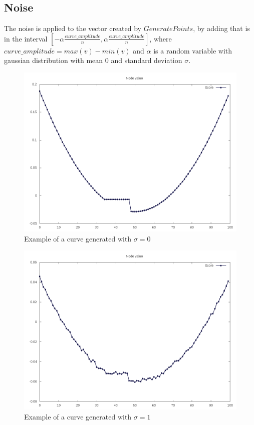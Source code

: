\documentclass[12pt]{article}
\begin{document}
\subsection{Noise}
The noise is applied to the vector created by $GeneratePoints$, by adding that is in the interval 
$[-\alpha \frac{curve\_amplitude}{n}, \alpha \frac{curve\_amplitude}{n}]$, where $curve\_amplitude = max(v) - min (v)$ and $\alpha$ is a random variable with gaussian distribution with mean $0$ and standard deviation $\sigma$.

\begin{figure}[H]
\caption{Example of a curve generated with $\sigma = 0$}
\centering
\includegraphics[scale=.5]{curve_sigma0}
\end{figure}

\begin{figure}[H]
\caption{Example of a curve generated with $\sigma = 1$}
\centering
\includegraphics[scale=.5]{curve_sigma1}
\end{figure}
\end{document}

